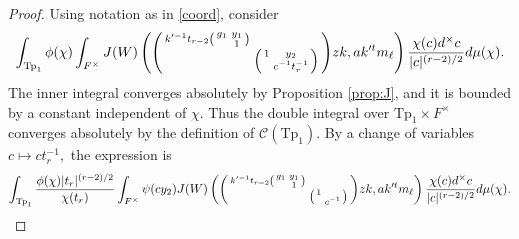 \documentclass[12pt]{amsart}
\theoremstyle{remark}
\numberwithin{equation}{section}
\theoremstyle{definition}
\newenvironment{psmatrix}
  {\left(\begin{smallmatrix}}
  {\end{smallmatrix}\right)}
\numberwithin{equation}{subsection}
\begin{document}
\begin{proof}  Using notation as in \eqref{coord}, consider
\begin{align*}  
\int_{\mathrm{Tp}_1}\phi(\chi)\int_{F^\times}
J(W)\left(\begin{psmatrix}k'^{-1}t_{r-2}\begin{psmatrix}  g_1 &  y_1 \\ & 1\end{psmatrix}& \\ &  \begin{psmatrix} 1 & y_2 \\ & c^{-1}t_r^{-1} \end{psmatrix} \end{psmatrix}zk,ak'^tm_\ell \right)
\frac{\chi(c) d^\times c}{|c|^{(r-2)/2}}d\mu( \chi).
\end{align*}
  The inner integral converges absolutely by Proposition \ref{prop:J}, and it is bounded by a constant independent of $\chi.$  Thus the double integral over $\mathrm{Tp}_1 \times F^\times$ converges absolutely by the definition of $\mathcal{C}(\mathrm{Tp}_1).$
By a change of variables $c \mapsto ct_r^{-1},$ the expression is 
\begin{align} \label{to:bound2}
\int_{\mathrm{Tp}_1}\frac{\phi(\chi)|t_r|^{(r-2)/2}}{\chi(t_r)}\int_{F^\times}\psi(cy_2)
J(W)\left(\begin{psmatrix}k'^{-1}t_{r-2}\begin{psmatrix}  g_1 &  y_1 \\ &1\end{psmatrix}& \\ &  \begin{psmatrix} 1 &  \\ & c^{-1} \end{psmatrix} \end{psmatrix}zk,ak'^tm_\ell \right)
\frac{\chi(c) d^\times c}{|c|^{(r-2)/2}}d\mu( \chi).
\end{align}


\end{proof}
\end{document}
